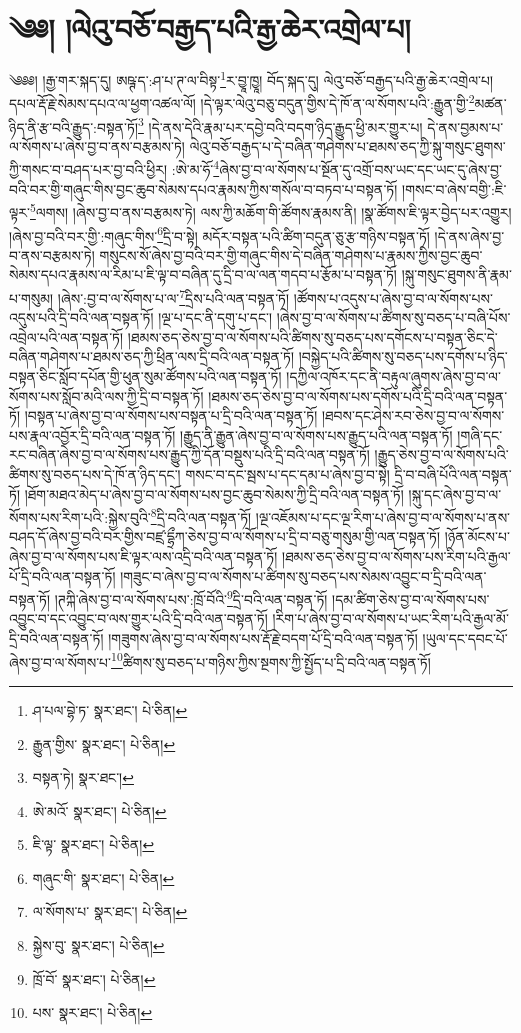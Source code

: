\setcounter{footnote}{0} 
\chapter{༄༅། །ལེའུ་བཅོ་བརྒྱད་པའི་རྒྱ་ཆེར་འགྲེལ་པ།}༄༅༅། །རྒྱ་གར་སྐད་དུ། ཨཥྚ་ད་:ཤ་པ་ཊ་ལ་བིསྟ་\footnote{ཤ་པལ་བྷེ་ཏ་  སྣར་ཐང་།  པེ་ཅིན། }ར་བྱཱ་ཁྱཱ། བོད་སྐད་དུ། ལེའུ་བཅོ་བརྒྱད་པའི་རྒྱ་ཆེར་འགྲེལ་པ། དཔལ་རྡོ་རྗེ་སེམས་དཔའ་ལ་ཕྱག་འཚལ་ལོ། །དེ་ལྟར་ལེའུ་བཅུ་བདུན་གྱིས་དེ་ཁོ་ན་ལ་སོགས་པའི་:རྒྱུན་གྱི་\footnote{རྒྱུན་གྱིས་  སྣར་ཐང་།  པེ་ཅིན། }མཚན་ཉིད་ནི་རྩ་བའི་རྒྱུད་:བསྟན་ཏོ།\footnote{བསྟན་ཏེ།  སྣར་ཐང་། } །དེ་ནས་དེའི་རྣམ་པར་དབྱེ་བའི་བདག་ཉིད་རྒྱུད་ཕྱི་མར་གྱུར་པ། དེ་ནས་བྱམས་པ་ལ་སོགས་པ་ཞེས་བྱ་བ་ནས་བརྩམས་ཏེ། ལེའུ་བཅོ་བརྒྱད་པ་དེ་བཞིན་གཤེགས་པ་ཐམས་ཅད་ཀྱི་སྐུ་གསུང་ཐུགས་ཀྱི་གསང་བ་བཤད་པར་བྱ་བའི་ཕྱིར། :ཨེ་མ་ཧོ་\footnote{ཨེ་མའོ་  སྣར་ཐང་།  པེ་ཅིན། }ཞེས་བྱ་བ་ལ་སོགས་པ་སྔོན་དུ་འགྲོ་བས་ཡང་དང་ཡང་དུ་ཞེས་བྱ་བའི་བར་གྱི་གཞུང་གིས་བྱང་ཆུབ་སེམས་དཔའ་རྣམས་ཀྱིས་གསོལ་བ་བཏབ་པ་བསྟན་ཏོ། །གསང་བ་ཞེས་བགྱི་:ཇི་ལྟར་\footnote{ཇི་ལྟ་  སྣར་ཐང་།  པེ་ཅིན། }ལགས། །ཞེས་བྱ་བ་ནས་བརྩམས་ཏེ། ལས་ཀྱི་མཆོག་གི་ཚོགས་རྣམས་ནི། །སྣ་ཚོགས་ཇི་ལྟར་བྱེད་པར་འགྱུར། །ཞེས་བྱ་བའི་བར་གྱི་:གཞུང་གིས་\footnote{གཞུང་གི་  སྣར་ཐང་།  པེ་ཅིན། }དྲི་བ་སྟེ། མདོར་བསྟན་པའི་ཚིག་བདུན་ཅུ་རྩ་གཉིས་བསྟན་ཏོ། །དེ་ནས་ཞེས་བྱ་བ་ནས་བརྩམས་ཏེ། གསུངས་སོ་ཞེས་བྱ་བའི་བར་གྱི་གཞུང་གིས་དེ་བཞིན་གཤེགས་པ་རྣམས་ཀྱིས་བྱང་ཆུབ་སེམས་དཔའ་རྣམས་ལ་རིམ་པ་ཇི་ལྟ་བ་བཞིན་དུ་དྲི་བ་ལ་ལན་གདབ་པ་རྩོམ་པ་བསྟན་ཏོ། །སྐུ་གསུང་ཐུགས་ནི་རྣམ་པ་གསུམ། །ཞེས་:བྱ་བ་ལ་སོགས་པ་ལ་\footnote{ལ་སོགས་པ་  སྣར་ཐང་།  པེ་ཅིན། }དྲིས་པའི་ལན་བསྟན་ཏོ། །ཚོགས་པ་འདུས་པ་ཞེས་བྱ་བ་ལ་སོགས་པས་འདུས་པའི་དྲི་བའི་ལན་བསྟན་ཏོ། །ལྔ་པ་དང་ནི་དགུ་པ་དང་། །ཞེས་བྱ་བ་ལ་སོགས་པ་ཚིགས་སུ་བཅད་པ་བཞི་པོས་འབྲེལ་པའི་ལན་བསྟན་ཏོ། །ཐམས་ཅད་ཅེས་བྱ་བ་ལ་སོགས་པའི་ཚིགས་སུ་བཅད་པས་དགོངས་པ་བསྟན་ཅིང་དེ་བཞིན་གཤེགས་པ་ཐམས་ཅད་ཀྱི་ཕྲིན་ལས་དྲི་བའི་ལན་བསྟན་ཏོ། །བསྐྱེད་པའི་ཚིགས་སུ་བཅད་པས་དགོས་པ་ཉིད་བསྟན་ཅིང་སློབ་དཔོན་གྱི་ཕུན་སུམ་ཚོགས་པའི་ལན་བསྟན་ཏོ། །དཀྱིལ་འཁོར་དང་ནི་བརྟུལ་ཞུགས་ཞེས་བྱ་བ་ལ་སོགས་པས་སློབ་མའི་ལས་ཀྱི་དྲི་བ་བསྟན་ཏོ། །ཐམས་ཅད་ཅེས་བྱ་བ་ལ་སོགས་པས་དགོས་པའི་དྲི་བའི་ལན་བསྟན་ཏོ། །བསྟན་པ་ཞེས་བྱ་བ་ལ་སོགས་པས་བསྟན་པ་དྲི་བའི་ལན་བསྟན་ཏོ། །ཐབས་དང་ཤེས་རབ་ཅེས་བྱ་བ་ལ་སོགས་པས་རྣལ་འབྱོར་དྲི་བའི་ལན་བསྟན་ཏོ། །རྒྱུད་ནི་རྒྱུན་ཞེས་བྱ་བ་ལ་སོགས་པས་རྒྱུད་པའི་ལན་བསྟན་ཏོ། །གཞི་དང་རང་བཞིན་ཞེས་བྱ་བ་ལ་སོགས་པས་རྒྱུད་ཀྱི་དོན་བསྡུས་པའི་དྲི་བའི་ལན་བསྟན་ཏོ། །རྒྱུད་ཅེས་བྱ་བ་ལ་སོགས་པའི་ཚིགས་སུ་བཅད་པས་དེ་ཁོ་ན་ཉིད་དང་། གསང་བ་དང་སྦས་པ་དང་དམ་པ་ཞེས་བྱ་བ་སྟེ། དྲི་བ་བཞི་པོའི་ལན་བསྟན་ཏོ། །ཐོག་མཐའ་མེད་པ་ཞེས་བྱ་བ་ལ་སོགས་པས་བྱང་ཆུབ་སེམས་ཀྱི་དྲི་བའི་ལན་བསྟན་ཏོ། །སྐུ་དང་ཞེས་བྱ་བ་ལ་སོགས་པས་རིག་པའི་:སྐྱེས་བུའི་\footnote{སྐྱེས་བུ་  སྣར་ཐང་།  པེ་ཅིན། }དྲི་བའི་ལན་བསྟན་ཏོ། །ལྔ་འཇོམས་པ་དང་ལྔ་རིག་པ་ཞེས་བྱ་བ་ལ་སོགས་པ་ནས་བཤད་དོ་ཞེས་བྱ་བའི་བར་གྱིས་བཛྲ་དྷྲྀཀ་ཅེས་བྱ་བ་ལ་སོགས་པ་དྲི་བ་བཅུ་གསུམ་གྱི་ལན་བསྟན་ཏོ། །ཉོན་མོངས་པ་ཞེས་བྱ་བ་ལ་སོགས་པས་ཇི་ལྟར་ལས་འདྲི་བའི་ལན་བསྟན་ཏོ། །ཐམས་ཅད་ཅེས་བྱ་བ་ལ་སོགས་པས་རིག་པའི་རྒྱལ་པོ་དྲི་བའི་ལན་བསྟན་ཏོ། །གཟུང་བ་ཞེས་བྱ་བ་ལ་སོགས་པ་ཚིགས་སུ་བཅད་པས་སེམས་འབྱུང་བ་དྲི་བའི་ལན་བསྟན་ཏོ། །ཊཀྐི་ཞེས་བྱ་བ་ལ་སོགས་པས་:ཁྲོ་བོའི་\footnote{ཁྲོ་བོ་  སྣར་ཐང་།  པེ་ཅིན། }དྲི་བའི་ལན་བསྟན་ཏོ། །དམ་ཚིག་ཅེས་བྱ་བ་ལ་སོགས་པས་འབྱུང་བ་དང་འབྱུང་བ་ལས་གྱུར་པའི་དྲི་བའི་ལན་བསྟན་ཏོ། །རིག་པ་ཞེས་བྱ་བ་ལ་སོགས་པ་ཡང་རིག་པའི་རྒྱལ་མོ་དྲི་བའི་ལན་བསྟན་ཏོ། །གཟུགས་ཞེས་བྱ་བ་ལ་སོགས་པས་རྡོ་རྗེ་བདག་པོ་དྲི་བའི་ལན་བསྟན་ཏོ། །ཡུལ་དང་དབང་པོ་ཞེས་བྱ་བ་ལ་སོགས་པ་\footnote{པས་  སྣར་ཐང་།  པེ་ཅིན། }ཚིགས་སུ་བཅད་པ་གཉིས་ཀྱིས་སྔགས་ཀྱི་སྤྱོད་པ་དྲི་བའི་ལན་བསྟན་ཏོ། 